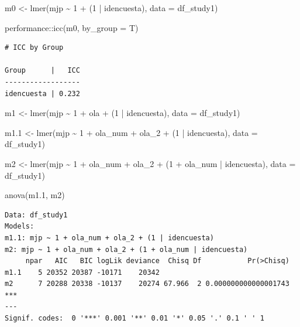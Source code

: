 \documentclass[
  12pt,
  letterpaper,
  DIV=11,
  numbers=noendperiod]{scrartcl}
\newenvironment{Shaded}{\begin{snugshade}}{\end{snugshade}}
\newcommand{\AttributeTok}[1]{\textcolor[rgb]{0.40,0.45,0.13}{#1}}
\newcommand{\DecValTok}[1]{\textcolor[rgb]{0.68,0.00,0.00}{#1}}
\newcommand{\FloatTok}[1]{\textcolor[rgb]{0.68,0.00,0.00}{#1}}
\newcommand{\FunctionTok}[1]{\textcolor[rgb]{0.28,0.35,0.67}{#1}}
\newcommand{\NormalTok}[1]{\textcolor[rgb]{0.00,0.23,0.31}{#1}}
\newcommand{\OtherTok}[1]{\textcolor[rgb]{0.00,0.23,0.31}{#1}}
\newcommand{\SpecialCharTok}[1]{\textcolor[rgb]{0.37,0.37,0.37}{#1}}
\begin{document}
\begin{Shaded}
\begin{Highlighting}[]
\NormalTok{m0 }\OtherTok{\textless{}{-}} \FunctionTok{lmer}\NormalTok{(mjp }\SpecialCharTok{\textasciitilde{}} \DecValTok{1} \SpecialCharTok{+}\NormalTok{ (}\DecValTok{1} \SpecialCharTok{|}\NormalTok{ idencuesta), }
                \AttributeTok{data =}\NormalTok{ df\_study1)}

\NormalTok{performance}\SpecialCharTok{::}\FunctionTok{icc}\NormalTok{(m0, }\AttributeTok{by\_group =}\NormalTok{ T)}
\end{Highlighting}
\end{Shaded}

\begin{verbatim}
# ICC by Group

Group      |   ICC
------------------
idencuesta | 0.232
\end{verbatim}

\begin{Shaded}
\begin{Highlighting}[]
\NormalTok{m1 }\OtherTok{\textless{}{-}} \FunctionTok{lmer}\NormalTok{(mjp }\SpecialCharTok{\textasciitilde{}} \DecValTok{1} \SpecialCharTok{+}\NormalTok{ ola }\SpecialCharTok{+}\NormalTok{ (}\DecValTok{1} \SpecialCharTok{|}\NormalTok{ idencuesta),}
                \AttributeTok{data =}\NormalTok{ df\_study1)}

\NormalTok{m1}\FloatTok{.1} \OtherTok{\textless{}{-}} \FunctionTok{lmer}\NormalTok{(mjp }\SpecialCharTok{\textasciitilde{}} \DecValTok{1} \SpecialCharTok{+}\NormalTok{ ola\_num }\SpecialCharTok{+}\NormalTok{ ola\_2 }\SpecialCharTok{+}\NormalTok{ (}\DecValTok{1} \SpecialCharTok{|}\NormalTok{ idencuesta),}
                \AttributeTok{data =}\NormalTok{ df\_study1)}

\NormalTok{m2 }\OtherTok{\textless{}{-}} \FunctionTok{lmer}\NormalTok{(mjp }\SpecialCharTok{\textasciitilde{}} \DecValTok{1} \SpecialCharTok{+}\NormalTok{ ola\_num }\SpecialCharTok{+}\NormalTok{ ola\_2 }\SpecialCharTok{+}\NormalTok{ (}\DecValTok{1} \SpecialCharTok{+}\NormalTok{ ola\_num }\SpecialCharTok{|}\NormalTok{ idencuesta),}
                \AttributeTok{data =}\NormalTok{ df\_study1)}

\FunctionTok{anova}\NormalTok{(m1}\FloatTok{.1}\NormalTok{, m2)}
\end{Highlighting}
\end{Shaded}

\begin{verbatim}
Data: df_study1
Models:
m1.1: mjp ~ 1 + ola_num + ola_2 + (1 | idencuesta)
m2: mjp ~ 1 + ola_num + ola_2 + (1 + ola_num | idencuesta)
     npar   AIC   BIC logLik deviance  Chisq Df           Pr(>Chisq)    
m1.1    5 20352 20387 -10171    20342                                   
m2      7 20288 20338 -10137    20274 67.966  2 0.000000000000001743 ***
---
Signif. codes:  0 '***' 0.001 '**' 0.01 '*' 0.05 '.' 0.1 ' ' 1
\end{verbatim}
\end{document}

